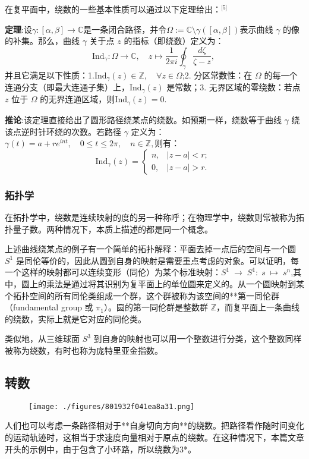在复平面中，绕数的一些基本性质可以通过以下定理给出：\(^\text{[5]}\)

\textbf{定理}:设$\gamma:[\alpha,\beta]\to\mathbb{C}$是一条闭合路径，并令$\Omega := \mathbb{C} \setminus \gamma([\alpha,\beta])$表示曲线 $\gamma$ 的像的补集。那么，曲线 $\gamma$ 关于点 $z$ 的指标（即绕数）定义为：
$$
\mathrm{Ind}_{\gamma}:\Omega\to\mathbb{C}, \quad 
z \mapsto 
\frac{1}{2\pi i}
\oint_{\gamma} 
\frac{d\zeta}{\zeta - z},~
$$
并且它满足以下性质：1.$\mathrm{Ind}_{\gamma}(z) \in \mathbb{Z}, \quad \forall z\in\Omega$;2. 分区常数性：在 $\Omega$ 的每一个连通分支（即最大连通子集）上，$\mathrm{Ind}_{\gamma}(z)$ 是常数；3. 无界区域的零绕数：若点 $z$ 位于 $\Omega$ 的无界连通区域，则$\mathrm{Ind}_{\gamma}(z) = 0$.

\textbf{推论}:该定理直接给出了圆形路径绕某点的绕数。如预期一样，绕数等于曲线 $\gamma$ 绕该点逆时针环绕的次数。若路径 $\gamma$ 定义为：$\gamma(t) = a + r e^{int}, \quad 0 \leq t \leq 2\pi, \quad n \in \mathbb{Z},$则有：
$$
\mathrm{Ind}_{\gamma}(z) =
\begin{cases}
n, & |z-a|<r;\\[6pt]
0, & |z-a|>r.
\end{cases}~
$$
\subsubsection{拓扑学}
在拓扑学中，绕数是连续映射的度的另一种称呼；在物理学中，绕数则常被称为拓扑量子数。两种情况下，本质上描述的都是同一个概念。

上述曲线绕某点的例子有一个简单的拓扑解释：平面去掉一点后的空间与一个圆 $S^1$ 是同伦等价的，因此从圆到自身的映射是需要重点考虑的对象。可以证明，每一个这样的映射都可以连续变形（同伦）为某个标准映射：$S^1 \;\to\; S^1: \; s \;\mapsto\; s^n$,其中，圆上的乘法是通过将其识别为复平面上的单位圆来定义的。从一个圆映射到某个拓扑空间的所有同伦类组成一个群，这个群被称为该空间的**第一同伦群（fundamental group 或 $\pi_1$）。圆的第一同伦群是整数群 $\mathbb{Z}$，而复平面上一条曲线的绕数，实际上就是它对应的同伦类。

类似地，从三维球面 $S^3$ 到自身的映射也可以用一个整数进行分类，这个整数同样被称为绕数，有时也称为庞特里亚金指数。
\subsection{转数}
\begin{figure}[ht]
\centering
\texttt{[image: ./figures/801932f041ea8a31.png]}
\caption{} \label{fig_JRS_3}
\end{figure}
人们也可以考虑一条路径相对于**自身切向方向**的绕数。把路径看作随时间变化的运动轨迹时，这相当于求速度向量相对于原点的绕数。在这种情况下，本篇文章开头的示例中，由于包含了小环路，所以绕数为3*。

